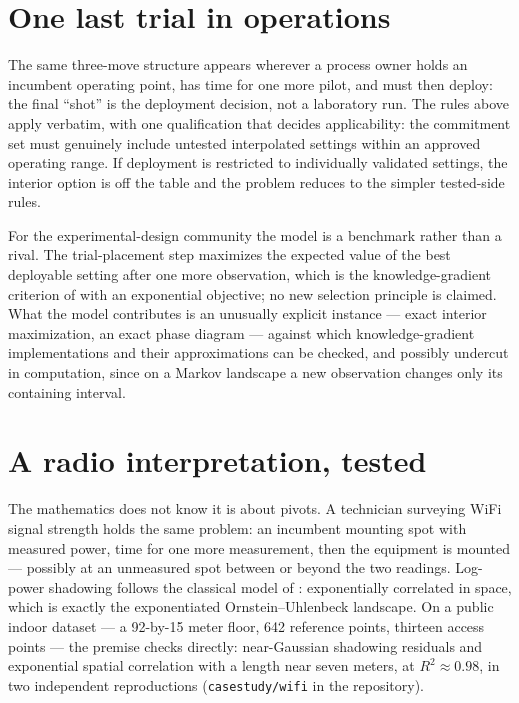 \documentclass[11pt]{article}
\theoremstyle{itheads}
\begin{document}
\section{One last trial in operations}

The same three-move structure appears wherever a process owner holds an
incumbent operating point, has time for one more pilot, and must then
deploy: the final ``shot'' is the deployment decision, not a
laboratory run. The rules above apply verbatim, with one qualification
that decides applicability: the commitment set must genuinely include
untested interpolated settings within an approved operating range. If
deployment is restricted to individually validated settings, the
interior option is off the table and the problem reduces to the
simpler tested-side rules.

For the experimental-design community the model is a benchmark rather
than a rival. The trial-placement step maximizes the expected value of
the best deployable setting after one more observation, which is the
knowledge-gradient criterion of \citet{frazier2008} with an
exponential objective; no new selection principle is claimed. What the
model contributes is an unusually explicit instance --- exact interior
maximization, an exact phase diagram --- against which
knowledge-gradient implementations and their approximations can be
checked, and possibly undercut in computation, since on a Markov
landscape a new observation changes only its containing interval.

\section{A radio interpretation, tested}

The mathematics does not know it is about pivots. A technician
surveying WiFi signal strength holds the same problem: an incumbent
mounting spot with measured power, time for one more measurement, then
the equipment is mounted --- possibly at an unmeasured spot between or
beyond the two readings. Log-power shadowing follows the classical
model of \citet{gudmundson1991}: exponentially correlated in space,
which is exactly the exponentiated Ornstein--Uhlenbeck landscape. On a
public indoor dataset \citep{feng2024} --- a 92-by-15 meter floor, 642
reference points, thirteen access points --- the premise checks
directly: near-Gaussian shadowing residuals and exponential spatial
correlation with a length near seven meters, at $R^2 \approx 0.98$, in
two independent reproductions (\texttt{casestudy/wifi} in the
repository).
\end{document}
